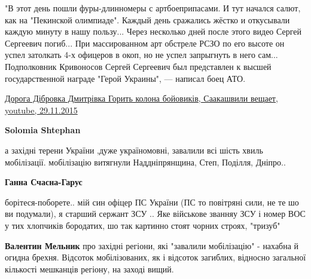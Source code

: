 \begin{itemize}
\begin{itemize}
{"В этот день пошли фуры-длинномеры с артбоеприпасами. И тут начался салют, как
на "Пекинской олимпиаде". Каждый день сражались жёстко и откусывали каждую
минуту в нашу пользу... Через несколько дней после этого видео Сергей Сергеевич
погиб... При массированном арт обстреле РСЗО по его высоте он успел затолкать
4-х офицеров в окоп, но не успел запрыгнуть в него сам... Подполковник
Кривоносов Сергей Сергеевич был представлен к высшей государственной награде
"Герой Украины", — написал боец АТО.
}

\href{https://www.youtube.com/watch?v=KTJbAvkm9GA}{
Дорога Дібровка Дмитрівка Горить колона бойовиків,%
Саакашвили вещает, youtube, 29.11.2015%
}

 
\textbf{Solomia Shtephan} 

а західні терени України ,дуже україномовні, завалили всі шість хвиль
мобілізації. мобілізацію витягнули Наддніпрянщина, Степ, Поділля, Дніпро..


 
\textbf{Ганна Счасна-Гарус} 

борітеся-поборете.. мій син офіцер ПС України (ПС то повітряні сили, не те шо ви
подумали), я старший сержант ЗСУ .. Яке військове званняу ЗСУ і номер ВОС у тих
хлопчиків бородатих, шо так картинно стоят чорних строях, "тризуб"


 
\textbf{Валентин Мельник} про західні регіони, які "завалили мобілізацію" - нахабна й
огидна брехня. Відсоток мобілізованих, як і відсоток загиблих, відносно
загальної кількості мешканців регіону, на заході вищий.

 

\end{itemize}
\end{itemize}
